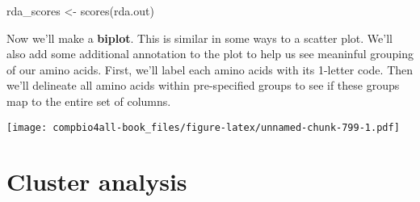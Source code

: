 \documentclass[
]{book}
\newenvironment{Shaded}{\begin{snugshade}}{\end{snugshade}}
\newcommand{\AttributeTok}[1]{\textcolor[rgb]{0.77,0.63,0.00}{#1}}
\newcommand{\CommentTok}[1]{\textcolor[rgb]{0.56,0.35,0.01}{\textit{#1}}}
\newcommand{\DecValTok}[1]{\textcolor[rgb]{0.00,0.00,0.81}{#1}}
\newcommand{\FloatTok}[1]{\textcolor[rgb]{0.00,0.00,0.81}{#1}}
\newcommand{\FunctionTok}[1]{\textcolor[rgb]{0.00,0.00,0.00}{#1}}
\newcommand{\NormalTok}[1]{#1}
\newcommand{\OtherTok}[1]{\textcolor[rgb]{0.56,0.35,0.01}{#1}}
\newcommand{\SpecialCharTok}[1]{\textcolor[rgb]{0.00,0.00,0.00}{#1}}
\newcommand{\StringTok}[1]{\textcolor[rgb]{0.31,0.60,0.02}{#1}}
\begin{document}
\begin{Shaded}
\begin{Highlighting}[]
\NormalTok{rda\_scores }\OtherTok{\textless{}{-}} \FunctionTok{scores}\NormalTok{(rda.out)}
\end{Highlighting}
\end{Shaded}

Now we'll make a \textbf{biplot}. This is similar in some ways to a scatter plot. We'll also add some additional annotation to the plot to help us see meaninful grouping of our amino acids. First, we'll label each amino acids with its 1-letter code. Then we'll delineate all amino acids within pre-specified groups to see if these groups map to the entire set of columns.

\begin{Shaded}
\end{Shaded}

\texttt{[image: compbio4all-book\_files/figure-latex/unnamed-chunk-799-1.pdf]}

\hypertarget{cluster-analysis-3}{%
\section{Cluster analysis}\label{cluster-analysis-3}}
\end{document}
